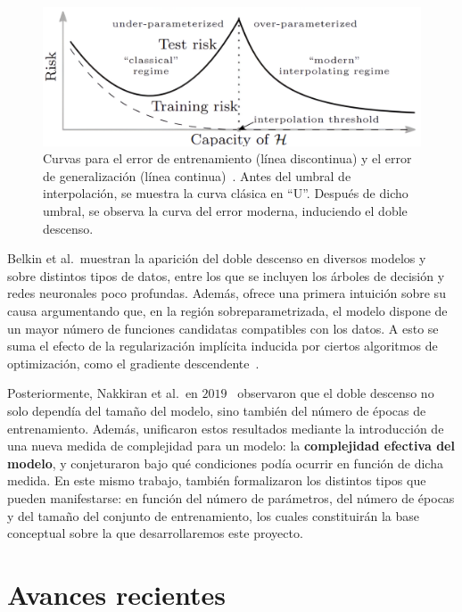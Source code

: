 \begin{figure}[h]
    \centering
    \includegraphics[width=0.8\linewidth]{img/estadoarte2.2.png}
    \caption[Curva del error unificada entre la teoría clásica y moderna~\cite{Belkin2019}.]{Curvas para el error de entrenamiento (línea discontinua) y el error de generalización (línea continua)~\cite{Belkin2019}. Antes del umbral de interpolación, se muestra la curva clásica en ``U''. Después de dicho umbral, se observa la curva del error moderna, induciendo el doble descenso.}\label{fig:estadoarte2.2}
\end{figure}

Belkin et al.\ muestran la aparición del doble descenso en diversos modelos y sobre distintos tipos de datos, entre los que se incluyen los árboles de decisión y redes neuronales poco profundas. Además, ofrece una primera intuición sobre su causa argumentando que, en la región sobreparametrizada, el modelo dispone de un mayor número de funciones candidatas compatibles con los datos. A esto se suma el efecto de la regularización implícita inducida por ciertos algoritmos de optimización, como el gradiente descendente~\cite{Soudry2024}.\newline

Posteriormente, Nakkiran et al.\ en $2019$~\cite{Nakkiran2019} observaron que el doble descenso no solo dependía del tamaño del modelo, sino también del número de épocas de entrenamiento. Además, unificaron estos resultados mediante la introducción de una nueva medida de complejidad para un modelo: la \textbf{complejidad efectiva del modelo}, y conjeturaron bajo qué condiciones podía ocurrir en función de dicha medida. En este mismo trabajo, también formalizaron los distintos tipos que pueden manifestarse: en función del número de parámetros, del número de épocas y del tamaño del conjunto de entrenamiento, los cuales constituirán la base conceptual sobre la que desarrollaremos este proyecto.\newline


\section{Avances recientes}\label{}

